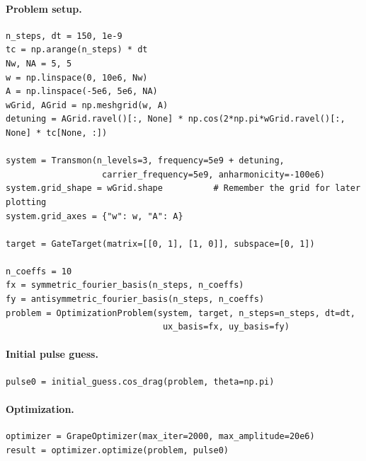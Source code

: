 \documentclass[a4paper,12pt]{article}
\begin{document}
\paragraph*{Problem setup.}
\begin{lstlisting}
n_steps, dt = 150, 1e-9
tc = np.arange(n_steps) * dt
Nw, NA = 5, 5
w = np.linspace(0, 10e6, Nw)
A = np.linspace(-5e6, 5e6, NA)
wGrid, AGrid = np.meshgrid(w, A)
detuning = AGrid.ravel()[:, None] * np.cos(2*np.pi*wGrid.ravel()[:, None] * tc[None, :])

system = Transmon(n_levels=3, frequency=5e9 + detuning,
                   carrier_frequency=5e9, anharmonicity=-100e6)
system.grid_shape = wGrid.shape          # Remember the grid for later plotting
system.grid_axes = {"w": w, "A": A}

target = GateTarget(matrix=[[0, 1], [1, 0]], subspace=[0, 1])

n_coeffs = 10
fx = symmetric_fourier_basis(n_steps, n_coeffs)
fy = antisymmetric_fourier_basis(n_steps, n_coeffs)
problem = OptimizationProblem(system, target, n_steps=n_steps, dt=dt,
                               ux_basis=fx, uy_basis=fy)
\end{lstlisting}

\paragraph*{Initial pulse guess.}
\begin{lstlisting}
pulse0 = initial_guess.cos_drag(problem, theta=np.pi)
\end{lstlisting}

\paragraph*{Optimization.}
\begin{lstlisting}
optimizer = GrapeOptimizer(max_iter=2000, max_amplitude=20e6)
result = optimizer.optimize(problem, pulse0)
\end{lstlisting}
\end{document}
